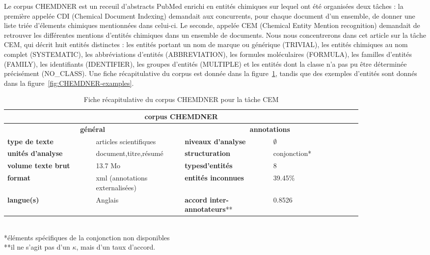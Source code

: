 \documentclass[PhD-Yoann-Dupont.tex]{subfiles}
\begin{document}
Le corpus CHEMDNER \citep{krallinger2015chemdner} est un receuil d'abstracts PubMed enrichi en entités chimiques sur lequel ont été organisées deux tâches : la première appelée CDI (Chemical Document Indexing) demandait aux concurrents, pour chaque document d'un ensemble, de donner une liste triée d'élements chimiques mentionnées dans celui-ci. Le seconde, appelée CEM (Chemical Entity Mention recognition) demandait de retrouver les différentes mentions d'entités chimiques dans un ensemble de documents. Nous nous concentrerons dans cet article sur la tâche CEM, qui décrit huit entités distinctes : les entités portant un nom de marque ou générique (TRIVIAL), les entités chimiques au nom complet (SYSTEMATIC), les abbréviations d'entités (ABBREVIATION), les formules moléculaires (FORMULA), les familles d'entités (FAMILY), les identifiants (IDENTIFIER), les groupes d'entités (MULTIPLE) et les entités dont la classe n'a pas pu être déterminée précisément (NO\_CLASS). Une fiche récapitulative du corpus est donnée dans la figure\ \ref{tab:chemdner-recap-card}, tandis que des exemples d'entités sont donnés dans la figure\ \ref{fig:CHEMDNER-examples}.

\begin{table}[ht!]
\centering
\begin{tabular}{|p{0.21\linewidth}|p{0.21\linewidth}|p{0.21\linewidth}|p{0.21\linewidth}|}
\hline
\multicolumn{4}{|c|}{\textbf{corpus CHEMDNER}} \\
\hline
\multicolumn{2}{|c|}{\textbf{général}} & \multicolumn{2}{c|}{\textbf{annotations}} \\
\hline
\textbf{type de texte} & articles scientifiques & \textbf{niveaux d'analyse} & $\emptyset$ \\
\hline
\textbf{unités d'analyse} & document,\newline titre,\newline résumé & \textbf{structuration} & conjonction* \\
\hline
\textbf{volume texte brut} & 13.7 Mo & \textbf{types\newline d'entités} & 8 \\
\hline
\textbf{format} & xml (annotations externalisées) & \textbf{entités inconnues} & 39.45\% \\
\hline
\textbf{langue(s)} & Anglais & \textbf{accord inter-\newline annotateurs}** & 0.8526 \\
\hline
\end{tabular}
\scriptsize{\\ *éléments spécifiques de la conjonction non disponibles}
\scriptsize{\\ **il ne s'agit pas d'un $\kappa$, mais d'un taux d'accord.}
\caption{Fiche récapitulative du corpus CHEMDNER pour la tâche CEM}
\label{tab:chemdner-recap-card}
\end{table}
\end{document}
